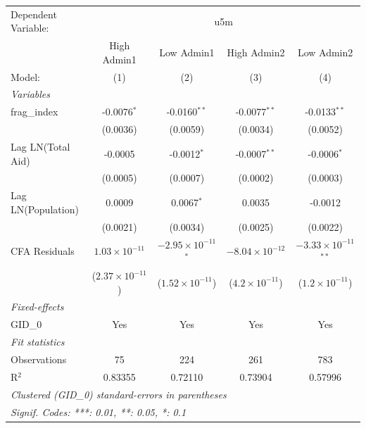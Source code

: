 
\begingroup
\centering
\begin{tabular}{lcccc}
   \tabularnewline \midrule \midrule
   Dependent Variable: & \multicolumn{4}{c}{u5m}\\
                      & High Admin1              & Low Admin1                    & High Admin2             & Low Admin2 \\   
   Model:             & (1)                      & (2)                           & (3)                     & (4)\\  
   \midrule
   \emph{Variables}\\
   frag\_index        & -0.0076$^{*}$            & -0.0160$^{**}$                & -0.0077$^{**}$          & -0.0133$^{**}$\\   
                      & (0.0036)                 & (0.0059)                      & (0.0034)                & (0.0052)\\   
   Lag LN(Total Aid)  & -0.0005                  & -0.0012$^{*}$                 & -0.0007$^{**}$          & -0.0006$^{*}$\\   
                      & (0.0005)                 & (0.0007)                      & (0.0002)                & (0.0003)\\   
   Lag LN(Population) & 0.0009                   & 0.0067$^{*}$                  & 0.0035                  & -0.0012\\   
                      & (0.0021)                 & (0.0034)                      & (0.0025)                & (0.0022)\\   
   CFA Residuals      & $1.03\times 10^{-11}$    & $-2.95\times 10^{-11}$$^{*}$  & $-8.04\times 10^{-12}$  & $-3.33\times 10^{-11}$$^{**}$\\    
                      & ($2.37\times 10^{-11}$)  & ($1.52\times 10^{-11}$)       & ($4.2\times 10^{-11}$)  & ($1.2\times 10^{-11}$)\\    
   \midrule
   \emph{Fixed-effects}\\
   GID\_0             & Yes                      & Yes                           & Yes                     & Yes\\  
   \midrule
   \emph{Fit statistics}\\
   Observations       & 75                       & 224                           & 261                     & 783\\  
   R$^2$              & 0.83355                  & 0.72110                       & 0.73904                 & 0.57996\\  
   \midrule \midrule
   \multicolumn{5}{l}{\emph{Clustered (GID\_0) standard-errors in parentheses}}\\
   \multicolumn{5}{l}{\emph{Signif. Codes: ***: 0.01, **: 0.05, *: 0.1}}\\
\end{tabular}
\par\endgroup


